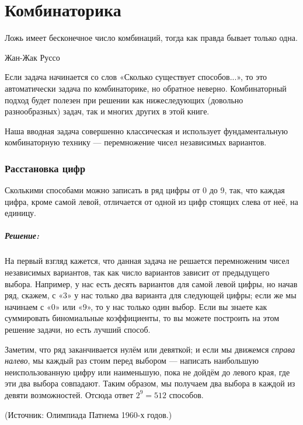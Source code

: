 \chapter*{Комбинаторика}

\epigraph{Ложь имеет бесконечное число комбинаций,
тогда как правда бывает только одна.}{Жан-Жак Руссо}

 
 
Если задача начинается со слов «Сколько существует способов...», то это автоматически задача по комбинаторике, но обратное неверно.
Комбинаторный подход будет полезен при решении как нижеследующих (довольно разнообразных) задач, так и многих других в этой книге.

Наша вводная задача совершенно классическая и использует фундаментальную
комбинаторную технику --- перемножение чисел независимых вариантов.

\subsection*{Расстановка цифр}%

Сколькими способами можно записать в ряд цифры от 0 до 9, так, что каждая цифра, кроме самой левой, отличается от одной из цифр стоящих слева от неё, на единицу.

\paragraph{Решение:} На первый взгляд кажется, что данная задача не решается перемноженим чисел независимых вариантов, так как число вариантов зависит от предыдущего выбора.
Например, у нас есть десять вариантов для самой левой цифры,
но начав ряд, скажем, с «3» у нас только два варианта для следующей цифры; если же мы начинаем с «0» или «9», то у нас только один выбор.
Если вы знаете как суммировать биномиальные коэффициенты, то вы можете построить на этом решение задачи, но есть лучший способ.

Заметим, что ряд заканчивается нулём или девяткой; и если мы движемся \emph{справа налево}, мы каждый раз стоим перед выбором --- написать наибольшую неиспользованную цифру или наименьшую, пока не дойдём до левого края, где эти два выбора совпадают.
Таким образом, мы получаем два выбора в каждой из девяти возможностей.
Отсюда ответ $2^9=512$ способов.\heart

(Источник: Олимпиада Патнема 1960-х годов.)%

\bigskip

